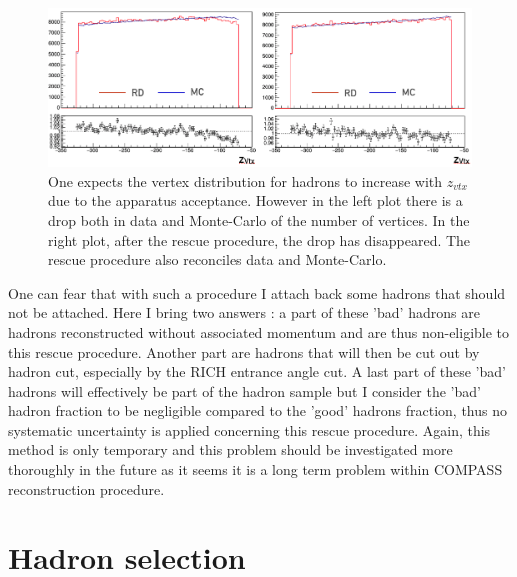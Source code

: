 \begin{figure}[!h]
	\includegraphics[scale=0.45]{./gfx/VertexDrop.png}
	\caption{One expects the vertex distribution for hadrons to increase with $z_{vtx}$ due to the apparatus acceptance. However in the left plot there is a drop both in data and Monte-Carlo of the number of vertices. In the right plot, after the rescue procedure, the drop has disappeared. The rescue procedure also reconciles data and Monte-Carlo.}
	\label{VertexDrop}
\end{figure}

One can fear that with such a procedure I attach back some hadrons that should not be attached. Here I bring two answers : a part of these 'bad' hadrons are hadrons reconstructed without associated momentum and are thus non-eligible to this rescue procedure. Another part are hadrons that will then be cut out by hadron cut, especially by the RICH entrance angle cut. A last part of these 'bad' hadrons will effectively be part of the hadron sample but I consider the 'bad' hadron fraction to be negligible compared to the 'good' hadrons fraction, thus no systematic uncertainty is applied concerning this rescue procedure. Again, this method is only temporary and this problem should be investigated more thoroughly in the future as it seems it is a long term problem within COMPASS reconstruction procedure.


\section{Hadron selection}

